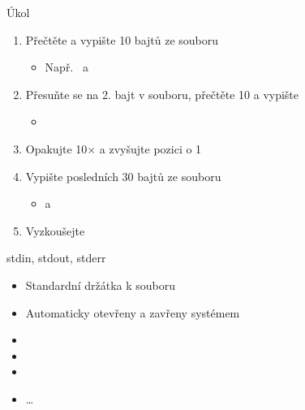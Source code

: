 \begin{frame}{Úkol}

  \begin{enumerate}
    \item Přečtěte a vypište 10 bajtů ze souboru
    \begin{itemize}
      \item Např.\  a 
    \end{itemize}

    \item Přesuňte se na 2. bajt v souboru, přečtěte 10 a vypište
    \begin{itemize}
      \item {}
    \end{itemize}

    \item Opakujte 10$\times$ a zvyšujte pozici o 1
    \item Vypište posledních 30 bajtů ze souboru
    \begin{itemize}
      \item {} a 
    \end{itemize}

    \item Vyzkoušejte
  \end{enumerate}

\end{frame}

\begin{frame}{stdin, stdout, stderr}

  \begin{itemize}
    \item Standardní držátka k souboru
    \item Automaticky otevřeny a zavřeny systémem

    \pause

    \item {}
    \item {}
    \item {}
    \item \dots
  \end{itemize}

\end{frame}

